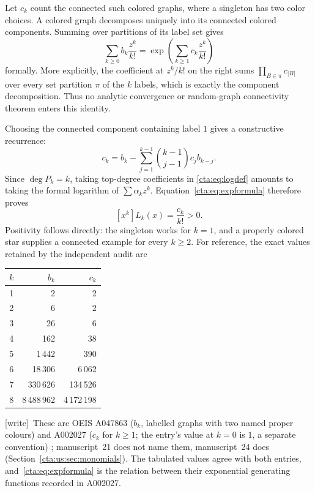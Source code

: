 \documentclass[11pt]{article}
\theoremstyle{definition}
\theoremstyle{remark}
\newcommand{\wtag}{\textup{[write]}}
\begin{document}
Let $c_k$ count the connected such colored graphs, where a singleton
has two color choices. A colored graph decomposes uniquely into its
connected colored components. Summing over partitions of its label set gives
\begin{equation}\label{cta:eq:expformula}
 \sum_{k\geq0}b_k\frac{z^k}{k!}
     =\exp\!\left(\sum_{k\geq1}c_k\frac{z^k}{k!}\right)
\end{equation}
formally. More explicitly, the coefficient at $z^k/k!$ on the right
sums $\prod_{B\in\pi}c_{|B|}$ over every set partition $\pi$ of the $k$
labels, which is exactly the component decomposition. Thus no analytic
convergence or random-graph connectivity theorem enters this identity.

Choosing the connected component containing label $1$ gives a constructive
recurrence:
\begin{equation}\label{cta:eq:crec}
 c_k=b_k-\sum_{j=1}^{k-1}\binom{k-1}{j-1}c_jb_{k-j}.
\end{equation}
Since $\deg P_k=k$, taking top-degree coefficients in \eqref{cta:eq:logdef}
amounts to taking the formal logarithm of $\sum\alpha_kz^k$.
Equation~\eqref{cta:eq:expformula} therefore proves
\begin{equation}\label{cta:eq:Lleading}
 [x^k]L_k(x)=\frac{c_k}{k!}>0.
\end{equation}
Positivity follows directly: the singleton works for $k=1$, and a
properly colored star supplies a connected example for every $k\geq2$.
For reference, the exact values retained by the independent audit are
\begin{center}
\begin{tabular}{r r r}
\toprule
$k$ & $b_k$ & $c_k$\\
\midrule
1&2&2\\2&6&2\\3&26&6\\4&162&38\\
5&1\,442&390\\6&18\,306&6\,062\\
7&330\,626&134\,526\\8&8\,488\,962&4\,172\,198\\
\bottomrule
\end{tabular}
\end{center}
\wtag\ These are OEIS A047863 ($b_k$, labelled graphs with two named proper
colours) and A002027 ($c_k$ for $k\ge1$; the entry's value at $k=0$ is $1$,
a separate convention) \cite{colored,connected}; manuscript~21 does not name
them, manuscript~24 does (Section~\ref{cta:us:sec:monomials}). The tabulated
values agree with both entries, and~\eqref{cta:eq:expformula} is the
relation between their exponential generating functions recorded in
A002027.
\end{document}
